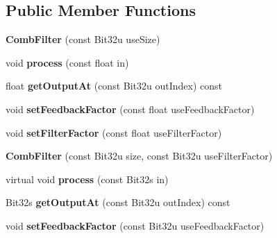 \subsection*{Public Member Functions}
\begin{DoxyCompactItemize}
\item 
\hypertarget{classMT32Emu_1_1CombFilter_a8a69987cd778815dd57b5fe39a061075}{{\bfseries Comb\-Filter} (const Bit32u use\-Size)}\label{classMT32Emu_1_1CombFilter_a8a69987cd778815dd57b5fe39a061075}

\item 
\hypertarget{classMT32Emu_1_1CombFilter_ace1d8df3fbf3f05e9cabbe32df7b1624}{void {\bfseries process} (const float in)}\label{classMT32Emu_1_1CombFilter_ace1d8df3fbf3f05e9cabbe32df7b1624}

\item 
\hypertarget{classMT32Emu_1_1CombFilter_a10ac24b24fc8228a4fc17e179299163f}{float {\bfseries get\-Output\-At} (const Bit32u out\-Index) const }\label{classMT32Emu_1_1CombFilter_a10ac24b24fc8228a4fc17e179299163f}

\item 
\hypertarget{classMT32Emu_1_1CombFilter_a1ca73514aa1a08ed52eae63c649a8848}{void {\bfseries set\-Feedback\-Factor} (const float use\-Feedback\-Factor)}\label{classMT32Emu_1_1CombFilter_a1ca73514aa1a08ed52eae63c649a8848}

\item 
\hypertarget{classMT32Emu_1_1CombFilter_aa167b306c4bfd7ae466bdfbffa2264a8}{void {\bfseries set\-Filter\-Factor} (const float use\-Filter\-Factor)}\label{classMT32Emu_1_1CombFilter_aa167b306c4bfd7ae466bdfbffa2264a8}

\item 
\hypertarget{classMT32Emu_1_1CombFilter_ab2f7553491cb2cca17daabe177544ae9}{{\bfseries Comb\-Filter} (const Bit32u size, const Bit32u use\-Filter\-Factor)}\label{classMT32Emu_1_1CombFilter_ab2f7553491cb2cca17daabe177544ae9}

\item 
\hypertarget{classMT32Emu_1_1CombFilter_ae1d1575e81a4585e6fc27f895fc2f8c4}{virtual void {\bfseries process} (const Bit32s in)}\label{classMT32Emu_1_1CombFilter_ae1d1575e81a4585e6fc27f895fc2f8c4}

\item 
\hypertarget{classMT32Emu_1_1CombFilter_ad33d09330d93a8daaa59be3c909e31a1}{Bit32s {\bfseries get\-Output\-At} (const Bit32u out\-Index) const }\label{classMT32Emu_1_1CombFilter_ad33d09330d93a8daaa59be3c909e31a1}

\item 
\hypertarget{classMT32Emu_1_1CombFilter_a7a5cd3f69e41e8ce0a06fe592102fbf3}{void {\bfseries set\-Feedback\-Factor} (const Bit32u use\-Feedback\-Factor)}\label{classMT32Emu_1_1CombFilter_a7a5cd3f69e41e8ce0a06fe592102fbf3}

\end{DoxyCompactItemize}
